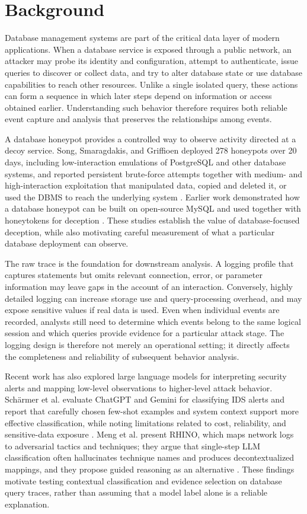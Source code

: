 \documentclass[12pt,a4paper]{report}
\begin{document}
\section{Background}
Database management systems are part of the critical data layer of modern applications. When a database service is exposed through a public network, an attacker may probe its identity and configuration, attempt to authenticate, issue queries to discover or collect data, and try to alter database state or use database capabilities to reach other resources. Unlike a single isolated query, these actions can form a sequence in which later steps depend on information or access obtained earlier. Understanding such behavior therefore requires both reliable event capture and analysis that preserves the relationships among events.

A database honeypot provides a controlled way to observe activity directed at a decoy service. Song, Smaragdakis, and Griffioen deployed 278 honeypots over 20 days, including low-interaction emulations of PostgreSQL and other database systems, and reported persistent brute-force attempts together with medium- and high-interaction exploitation that manipulated data, copied and deleted it, or used the DBMS to reach the underlying system \cite{song_decoy_2025}. Earlier work demonstrated how a database honeypot can be built on open-source MySQL and used together with honeytokens for deception \cite{wegerer_defeating_2016}. These studies establish the value of database-focused deception, while also motivating careful measurement of what a particular database deployment can observe.

The raw trace is the foundation for downstream analysis. A logging profile that captures statements but omits relevant connection, error, or parameter information may leave gaps in the account of an interaction. Conversely, highly detailed logging can increase storage use and query-processing overhead, and may expose sensitive values if real data is used. Even when individual events are recorded, analysts still need to determine which events belong to the same logical session and which queries provide evidence for a particular attack stage. The logging design is therefore not merely an operational setting; it directly affects the completeness and reliability of subsequent behavior analysis.

Recent work has also explored large language models for interpreting security alerts and mapping low-level observations to higher-level attack behavior. Schärmer et al. evaluate ChatGPT and Gemini for classifying IDS alerts and report that carefully chosen few-shot examples and system context support more effective classification, while noting limitations related to cost, reliability, and sensitive-data exposure \cite{afzal_let_2027}. Meng et al. present RHINO, which maps network logs to adversarial tactics and techniques; they argue that single-step LLM classification often hallucinates technique names and produces decontextualized mappings, and they propose guided reasoning as an alternative \cite{meng_rhino_2025}. These findings motivate testing contextual classification and evidence selection on database query traces, rather than assuming that a model label alone is a reliable explanation.
\end{document}
